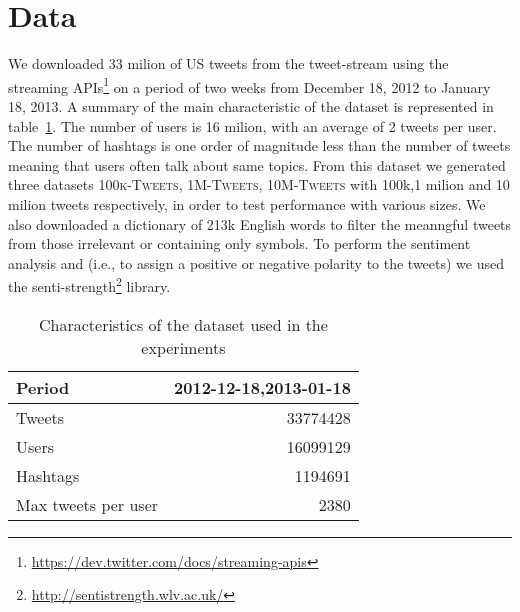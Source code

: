 \section{Data}

We downloaded 33 milion of US tweets from the tweet-stream using the streaming APIs\footnote{\url{https://dev.twitter.com/docs/streaming-apis}} on a period of two weeks from December 18, 2012 to January 18, 2013. 
A summary of the main characteristic of the dataset is represented in table~\ref{tbl:dataset}.
The number of users is 16 milion, with an average of 2 tweets per user. 
The number of hashtags is one order of magnitude less than the number of tweets meaning that users often talk about same topics.
From this dataset we generated three datasets \textsc{100k-Tweets}, \textsc{1M-Tweets}, \textsc{10M-Tweets} with 100k,1 milion and 10 milion tweets respectively, in order to test performance with various sizes. 
We also downloaded a dictionary of 213k English words to filter the meanngful tweets from those irrelevant or containing only symbols. 
To perform the sentiment analysis and (i.e., to assign a positive or negative polarity to the tweets) we used the senti-strength\footnote{\url{http://sentistrength.wlv.ac.uk/}} library. 

\begin{table}[htb]
\centering 
\begin{tabular}{|l|r|}
\hline		
Period			& 2012-12-18,2013-01-18\\
\hline
Tweets			&	33774428\\
Users 			&	16099129\\
Hashtags 		&	1194691\\
Max tweets per user & 2380\\  
\hline
\end{tabular}
\caption{Characteristics of the dataset used in the experiments}
\label{tbl:dataset}
\end{table}

